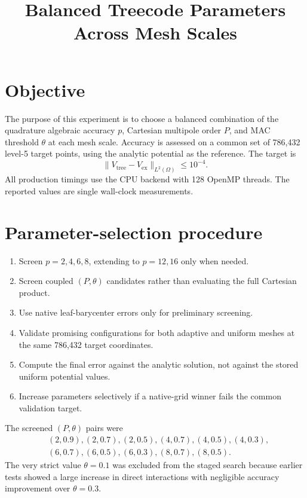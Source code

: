 \documentclass[11pt,a4paper]{article}
\title{Balanced Treecode Parameters Across Mesh Scales}
\author{}
\date{}
\begin{document}
\maketitle

\section{Objective}

The purpose of this experiment is to choose a balanced combination of the
quadrature algebraic accuracy $p$, Cartesian multipole order $P$, and MAC
threshold $\theta$ at each mesh scale. Accuracy is assessed on a common set of
786,432 level-5 target points, using the analytic potential as the reference.
The target is
\[
  \lVert V_{\mathrm{tree}}-V_{\mathrm{ex}}\rVert_{L^2(\Omega)}
  \le 10^{-4}.
\]
All production timings use the CPU backend with 128 OpenMP threads. The
reported values are single wall-clock measurements.

\section{Parameter-selection procedure}

\begin{enumerate}
  \item Screen $p=2,4,6,8$, extending to $p=12,16$ only when needed.
  \item Screen coupled $(P,\theta)$ candidates rather than evaluating the full
        Cartesian product.
  \item Use native leaf-barycenter errors only for preliminary screening.
  \item Validate promising configurations for both adaptive and uniform meshes
        at the same 786,432 target coordinates.
  \item Compute the final error against the analytic solution, not against the
        stored uniform potential values.
  \item Increase parameters selectively if a native-grid winner fails the
        common validation target.
\end{enumerate}

The screened $(P,\theta)$ pairs were
\[
\begin{split}
 &(2,0.9),(2,0.7),(2,0.5),(4,0.7),(4,0.5),(4,0.3),\\
 &(6,0.7),(6,0.5),(6,0.3),(8,0.7),(8,0.5).
\end{split}
\]
The very strict value $\theta=0.1$ was excluded from the staged search because
earlier tests showed a large increase in direct interactions with negligible
accuracy improvement over $\theta=0.3$.
\end{document}

